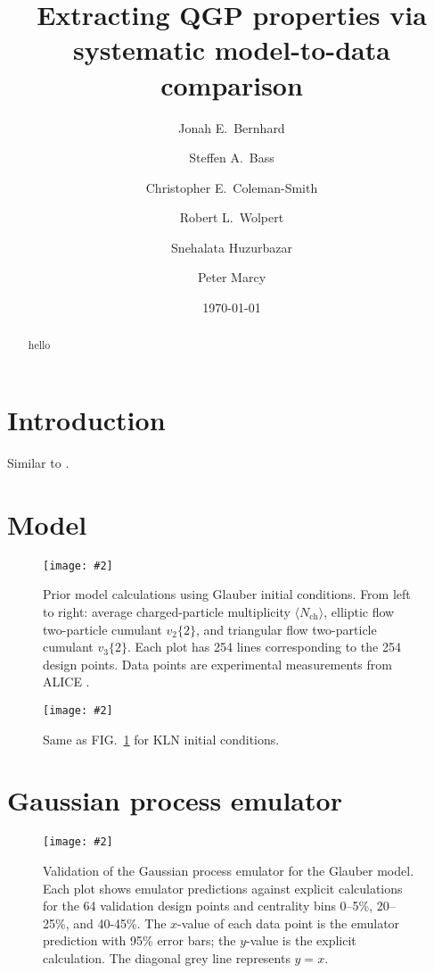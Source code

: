 \documentclass[aps, prc, reprint, amsmath]{revtex4-1}
\newcommand{\widefig}[3][t]{
  \begin{figure*}[#1]
    \texttt{[image: \#2]}
    \caption{\label{fig:#2}#3}
  \end{figure*}
}
\newcommand{\avg}[1]{\langle #1 \rangle}
\newcommand{\nch}{N_\text{ch}}
\newcommand{\vnk}[2]{v_#1\{#2\}}
\begin{document}
\title{Extracting QGP properties via systematic model-to-data comparison}

\author{Jonah E.\ Bernhard}
\author{Steffen A.\ Bass}
\author{Christopher E.\ Coleman-Smith}
\author{Robert L.\ Wolpert}

\author{Snehalata Huzurbazar}

\author{Peter Marcy}


\date{\today}

\begin{abstract}
  hello
\end{abstract}

\maketitle


\section{Introduction}

Similar to \cite{pratt-mtd, soltz-mtd}.


\section{Model}

\cite{bass-dumitru, nonaka-bass, song}
\cite{glauber}
\cite{kln}
\cite{vish}
\cite{cooper-frye}
\cite{iss}
\cite{urqmd1, urqmd2}
\cite{iebe}

\widefig{prior_draws_glb}{
  Prior model calculations using Glauber initial conditions.  From left to right:  average charged-particle
  multiplicity $\avg\nch$, elliptic flow two-particle cumulant $\vnk 2 2$, and triangular flow two-particle
  cumulant $\vnk 3 2$.  Each plot has 254 lines corresponding to the 254 design points.  Data points are
  experimental measurements from ALICE \cite{alice-cumulants}.
}

\widefig{prior_draws_kln}{
  Same as FIG.~\ref{fig:prior_draws_glb} for KLN initial conditions.
}


\section{Gaussian process emulator}

\cite{gpml}
\cite{ohagan, higdon2008, higdon2014}

\widefig{validation_glb}{
  Validation of the Gaussian process emulator for the Glauber model.  Each plot shows emulator predictions
  against explicit calculations for the 64 validation design points and centrality bins 0--5\%, 20--25\%, and
  40-45\%.  The $x$-value of each data point is the emulator prediction with 95\% error bars; the $y$-value is
  the explicit calculation.  The diagonal grey line represents $y = x$.
}
\end{document}
